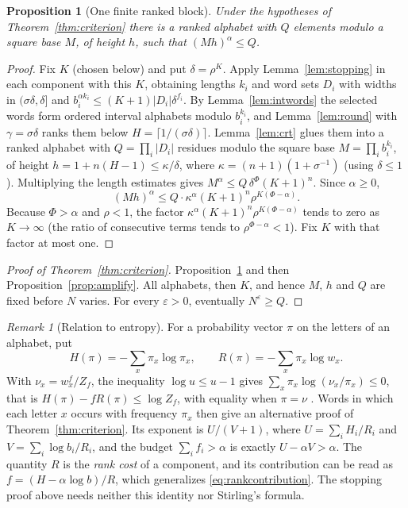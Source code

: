 \documentclass[11pt]{article}
\newtheorem{proposition}[theorem]{Proposition}
\theoremstyle{definition}
\theoremstyle{remark}
\newtheorem{remark}[theorem]{Remark}
\newcommand{\card}[1]{\lvert #1\rvert}
\begin{document}
\begin{proposition}[One finite ranked block]\label{prop:block}
Under the hypotheses of Theorem~\ref{thm:criterion} there is a ranked
alphabet with $Q$ elements modulo a square base $M$, of height $h$, such that
$(Mh)^\alpha\le Q$.
\end{proposition}
\begin{proof}
Fix $K$ (chosen below) and put $\delta=\rho^K$. Apply
Lemma~\ref{lem:stopping} in each component with this $K$, obtaining lengths
$k_i$ and word sets $D_i$ with widths in $(\sigma\delta,\delta]$ and
$b_i^{\alpha k_i}\le(K+1)\card{D_i}\delta^{f_i}$. By Lemma~\ref{lem:intwords}
the selected words form ordered interval alphabets modulo $b_i^{k_i}$, and
Lemma~\ref{lem:round} with $\gamma=\sigma\delta$ ranks them below
$H=\lceil1/(\sigma\delta)\rceil$. Lemma~\ref{lem:crt} glues them into a
ranked alphabet with $Q=\prod_i\card{D_i}$ residues modulo the square base
$M=\prod_ib_i^{k_i}$, of height $h=1+n(H-1)\le\kappa/\delta$, where
$\kappa=(n+1)(1+\sigma^{-1})$ (using $\delta\le1$). Multiplying the length
estimates gives $M^\alpha\le Q\,\delta^\Phi(K+1)^n$. Since $\alpha\ge0$,
\[
 (Mh)^\alpha\le Q\cdot \kappa^\alpha(K+1)^n\rho^{K(\Phi-\alpha)} .
\]
Because $\Phi>\alpha$ and $\rho<1$, the factor
$\kappa^\alpha(K+1)^n\rho^{K(\Phi-\alpha)}$ tends to zero as $K\to\infty$ (the
ratio of consecutive terms tends to $\rho^{\Phi-\alpha}<1$). Fix $K$ with
that factor at most one.
\end{proof}

\begin{proof}[Proof of Theorem~\ref{thm:criterion}]
Proposition~\ref{prop:block} and then Proposition~\ref{prop:amplify}.
All alphabets, then $K$, and hence $M$, $h$ and $Q$ are fixed before $N$
varies. For every $\varepsilon>0$, eventually $N^\varepsilon\ge Q$.
\end{proof}

\begin{remark}[Relation to entropy]\label{rem:entropy}
For a probability vector $\pi$ on the letters of an alphabet, put
\[
 H(\pi)=-\sum_x\pi_x\log\pi_x,\qquad R(\pi)=-\sum_x\pi_x\log w_x.
\]
With $\nu_x=w_x^f/Z_f$, the inequality $\log u\le u-1$ gives
$\sum_x\pi_x\log(\nu_x/\pi_x)\le0$, that is
$H(\pi)-fR(\pi)\le\log Z_f$, with equality when $\pi=\nu$
\cite{CoverThomas2006}. Words in which each letter $x$ occurs with frequency
$\pi_x$ then give an alternative proof of Theorem~\ref{thm:criterion}. Its
exponent is $U/(V+1)$, where $U=\sum_iH_i/R_i$ and
$V=\sum_i\log b_i/R_i$, and the budget $\sum_if_i>\alpha$ is exactly
$U-\alpha V>\alpha$. The quantity $R$ is
the \emph{rank cost} of a component, and its contribution can be read as
$f=(H-\alpha\log b)/R$, which generalizes \eqref{eq:rankcontribution}. The
stopping proof above needs neither this identity nor Stirling's formula.
\end{remark}
\end{document}
